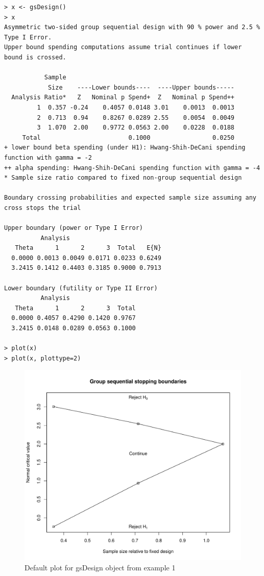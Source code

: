 \bigskip

\begin{verbatim}
> x <- gsDesign()
> x
Asymmetric two-sided group sequential design with 90 % power and 2.5 % Type I Error.
Upper bound spending computations assume trial continues if lower bound is crossed.

           Sample
            Size    ----Lower bounds----  ----Upper bounds-----
  Analysis Ratio*   Z   Nominal p Spend+  Z   Nominal p Spend++
         1  0.357 -0.24    0.4057 0.0148 3.01    0.0013  0.0013
         2  0.713  0.94    0.8267 0.0289 2.55    0.0054  0.0049
         3  1.070  2.00    0.9772 0.0563 2.00    0.0228  0.0188
     Total                        0.1000                 0.0250 
+ lower bound beta spending (under H1): Hwang-Shih-DeCani spending function with gamma = -2
++ alpha spending: Hwang-Shih-DeCani spending function with gamma = -4
* Sample size ratio compared to fixed non-group sequential design

Boundary crossing probabilities and expected sample size assuming any cross stops the trial

Upper boundary (power or Type I Error)
          Analysis
   Theta      1      2      3  Total   E{N}
  0.0000 0.0013 0.0049 0.0171 0.0233 0.6249
  3.2415 0.1412 0.4403 0.3185 0.9000 0.7913

Lower boundary (futility or Type II Error)
          Analysis
   Theta      1      2      3  Total
  0.0000 0.4057 0.4290 0.1420 0.9767
  3.2415 0.0148 0.0289 0.0563 0.1000

> plot(x)
> plot(x, plottype=2)
\end{verbatim}
\begin{figure}
\begin{center}
\includegraphics[width=.6\textwidth]{figs/boundplot.pdf}
\end{center}
\caption{Default plot for gsDesign object from example 1}
\end{figure}%

